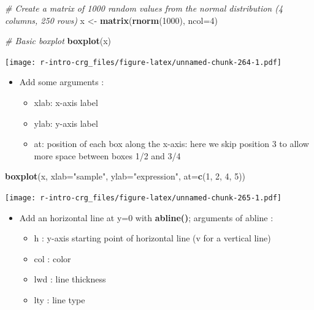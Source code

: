 \documentclass[]{book}
\newenvironment{Shaded}{\begin{snugshade}}{\end{snugshade}}
\newcommand{\CommentTok}[1]{\textcolor[rgb]{0.56,0.35,0.01}{\textit{#1}}}
\newcommand{\DataTypeTok}[1]{\textcolor[rgb]{0.13,0.29,0.53}{#1}}
\newcommand{\DecValTok}[1]{\textcolor[rgb]{0.00,0.00,0.81}{#1}}
\newcommand{\KeywordTok}[1]{\textcolor[rgb]{0.13,0.29,0.53}{\textbf{#1}}}
\newcommand{\NormalTok}[1]{#1}
\newcommand{\StringTok}[1]{\textcolor[rgb]{0.31,0.60,0.02}{#1}}
\providecommand{\tightlist}{%
  \setlength{\itemsep}{0pt}\setlength{\parskip}{0pt}}
\begin{document}
\begin{Shaded}
\begin{Highlighting}[]
\CommentTok{# Create a matrix of 1000 random values from the normal distribution (4 columns, 250 rows)}
\NormalTok{x <-}\StringTok{ }\KeywordTok{matrix}\NormalTok{(}\KeywordTok{rnorm}\NormalTok{(}\DecValTok{1000}\NormalTok{), }\DataTypeTok{ncol=}\DecValTok{4}\NormalTok{)}

\CommentTok{# Basic boxplot}
\KeywordTok{boxplot}\NormalTok{(x)}
\end{Highlighting}
\end{Shaded}

\texttt{[image: r-intro-crg\_files/figure-latex/unnamed-chunk-264-1.pdf]}

\begin{itemize}
\tightlist
\item
  Add some arguments :

  \begin{itemize}
  \tightlist
  \item
    xlab: x-axis label
  \item
    ylab: y-axis label
  \item
    at: position of each box along the x-axis: here we skip position 3 to allow more space between boxes 1/2 and 3/4
  \end{itemize}
\end{itemize}

\begin{Shaded}
\begin{Highlighting}[]
\KeywordTok{boxplot}\NormalTok{(x, }
    \DataTypeTok{xlab=}\StringTok{"sample"}\NormalTok{,}
    \DataTypeTok{ylab=}\StringTok{"expression"}\NormalTok{,}
    \DataTypeTok{at=}\KeywordTok{c}\NormalTok{(}\DecValTok{1}\NormalTok{, }\DecValTok{2}\NormalTok{, }\DecValTok{4}\NormalTok{, }\DecValTok{5}\NormalTok{))}
\end{Highlighting}
\end{Shaded}

\texttt{[image: r-intro-crg\_files/figure-latex/unnamed-chunk-265-1.pdf]}

\begin{itemize}
\tightlist
\item
  Add an horizontal line at y=0 with \textbf{abline()}; arguments of abline :

  \begin{itemize}
  \tightlist
  \item
    h : y-axis starting point of horizontal line (v for a vertical line)
  \item
    col : color
  \item
    lwd : line thickness
  \item
    lty : line type
  \end{itemize}
\end{itemize}
\end{document}
